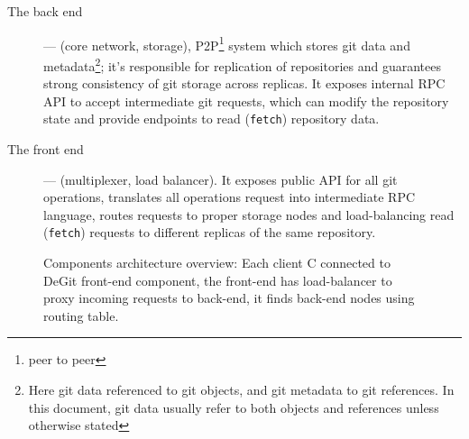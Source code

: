 \documentclass[acmlarge, screen, nonacm, 11pt]{acmart}
\newcommand{\code}[1]{\texttt{#1}}
\begin{document}
\begin{description}
  \item[The back end] --- (core network, storage), P2P\footnote{peer to peer} system which stores git data
    and metadata\footnote{Here git data referenced to git objects, and git metadata to git references.
    In this document, git data usually refer to both objects and references unless otherwise stated};
    it's responsible for replication of repositories and guarantees
    strong consistency of git storage across replicas. It exposes internal RPC API to accept intermediate git 
    requests, which can modify the repository state and provide endpoints to read (\code{fetch}) repository data.
  \item[The front end] --- (multiplexer, load balancer). It exposes public API for all git operations,
    translates all operations request into intermediate RPC language, routes requests to proper storage
    nodes and load-balancing read (\code{fetch}) requests to different replicas of the same repository.
\end{description}

\begin{figure}
  \begin{center}
  \end{center}
  \caption{
    Components architecture overview:
    Each client C connected to DeGit front-end component,
    the front-end has load-balancer to proxy incoming requests to back-end,
    it finds back-end nodes using routing table.
  }\label{fig:comp-arc-overview}
\end{figure}
\end{document}
